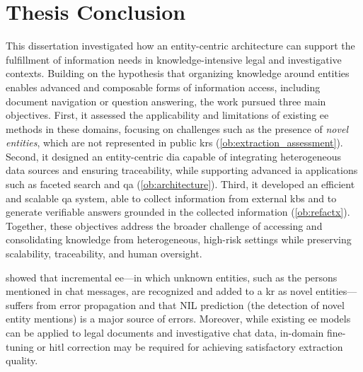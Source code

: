 \chapter{Thesis Conclusion}
\label{chap:conclusion}


This dissertation investigated how an entity-centric architecture can support the fulfillment of information needs in knowledge-intensive legal and investigative contexts.  
Building on the hypothesis that organizing knowledge around entities enables advanced and composable forms of information access, including document navigation or question answering, the work pursued three main objectives.  
First, it assessed the applicability and limitations of existing \acl{ee} methods in these domains, focusing on challenges such as the presence of \emph{novel entities}, which are not represented in public \aclp{kr} (\ref{ob:extraction_assessment}).  
Second, it designed an entity-centric \acl{dia} capable of integrating heterogeneous data sources and ensuring traceability, while supporting advanced \acl{ia} applications such as faceted search and \acl{qa} (\ref{ob:architecture}).  
Third, it developed an efficient and scalable \acl{qa} system, able to collect information from external \aclp{kb} and to generate verifiable answers grounded in the collected information (\ref{ob:refactx}).  
Together, these objectives address the broader challenge of accessing and consolidating knowledge from heterogeneous, high-risk settings while preserving scalability, traceability, and human oversight.



\medskip\noindent
{} showed that incremental \acl{ee}---in which unknown entities, such as the persons mentioned in chat messages, are recognized and added to a \acl{kr} as novel entities---suffers from error propagation and that NIL prediction (\ie the detection of novel entity mentions) is a major source of errors. Moreover, while existing \acl{ee} models can be applied to legal documents and investigative chat data, in-domain fine-tuning or \acl{hitl} correction may be required for achieving satisfactory extraction quality. 

